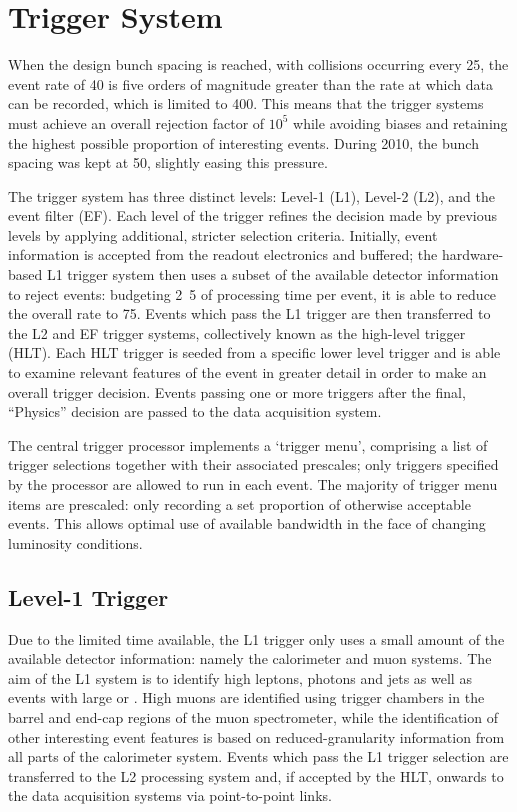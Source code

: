 \section{Trigger System}
\label{sec:detector:trigger}
When the design bunch spacing is reached, with collisions occurring every
\unit{25}{\nano\second}, the event rate of \unit{40}{\mega\Hz} is five orders of
magnitude greater than the rate at which data can be recorded, which is limited to 
\unit{400}{\Hz}. This means that the trigger systems must achieve an overall
rejection factor of $10^5$ while avoiding biases and retaining the highest
possible proportion of interesting events. During 2010, the bunch spacing was
kept at \unit{50}{\nano\second}, slightly easing this pressure.

The \ATLAS trigger system has three distinct levels: Level-1 (L1), Level-2 (L2),
and the event filter (EF). Each level of the trigger refines the decision made
by previous levels by applying additional, stricter selection criteria.
Initially, event information is accepted from the readout electronics and
buffered; the hardware-based L1 trigger system then uses a subset of the
available detector information to reject events: budgeting \unit{2.5}{\milli\second}
of processing time per event, it is able to reduce the overall rate to
\unit{75}{\kHz}. Events which pass the L1 trigger are then transferred to the L2
and EF trigger systems, collectively known as the high-level trigger (HLT). Each
HLT trigger is seeded from a specific lower level trigger and is able to examine
relevant features of the event in greater detail in order to make an overall
trigger decision. Events passing one or more triggers after the final,
``Physics'' decision are passed to the data acquisition system.

The central trigger processor implements a `trigger menu', comprising a list of
trigger selections together with their associated prescales; only triggers specified by
the processor are allowed to run in each event. The majority of trigger
menu items are prescaled: only recording a set proportion of otherwise acceptable
events. This allows optimal use of available bandwidth in the face of changing
luminosity conditions.

\subsection{Level-1 Trigger}
Due to the limited time available, the L1 trigger only uses a small amount of
the available detector information: namely the calorimeter and muon systems. The
aim of the L1 system is to identify high \pT leptons, photons and jets as well as events
with large \ETmiss or \ETtotal. High \pT muons are identified using trigger
chambers in the barrel and end-cap regions of the muon spectrometer, while the
identification of other interesting event features is based on reduced-granularity information from all parts of the
calorimeter system. Events which pass the L1 trigger selection are transferred to
the L2 processing system and, if accepted by the HLT, onwards to the
data acquisition systems via point-to-point links.

